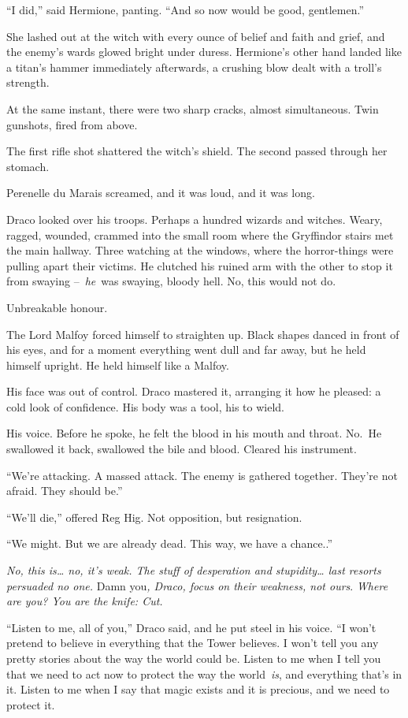 ``I did,'' said Hermione, panting. ``And so now would be good,
gentlemen.''

She lashed out at the witch with every ounce of belief and faith and
grief, and the enemy's wards glowed bright under duress. Hermione's
other hand landed like a titan's hammer immediately afterwards, a
crushing blow dealt with a troll's strength.

At the same instant, there were two sharp cracks, almost simultaneous.
Twin gunshots, fired from above.

The first rifle shot shattered the witch's shield. The second passed
through her stomach.

Perenelle du Marais screamed, and it was loud, and it was long.

\mybreak

Draco looked over his troops. Perhaps a hundred wizards and witches.
Weary, ragged, wounded, crammed into the small room where the Gryffindor
stairs met the main hallway. Three watching at the windows, where the
horror-things were pulling apart their victims. He clutched his ruined
arm with the other to stop it from swaying --~\emph{he}~was swaying,
bloody hell. No, this would not do.

Unbreakable honour.

The Lord Malfoy forced himself to straighten up. Black shapes danced in
front of his eyes, and for a moment everything went dull and far away,
but he held himself upright. He held himself like a Malfoy.

His face was out of control. Draco mastered it, arranging it how he
pleased: a cold look of confidence. His body was a tool, his to wield.

His voice. Before he spoke, he felt the blood in his mouth and throat.
No.~He swallowed it back, swallowed the bile and blood. Cleared his
instrument.

``We're attacking. A massed attack. The enemy is gathered together.
They're not afraid. They should be.''

``We'll die,'' offered Reg Hig. Not opposition, but resignation.

``We might. But we are already dead. This way, we have a chance..''

\emph{No, this is\ldots{} no, it's weak. The stuff of desperation and
stupidity\ldots{} last resorts persuaded no one.} Damn you\emph{, Draco,
focus on their weakness, not ours}. \emph{Where are you? You are the
knife: Cut.}

``Listen to me, all of you,'' Draco said, and he put steel in his voice.
``I won't pretend to believe in everything that the Tower believes. I
won't tell you any pretty stories about the way the world could be.
Listen to me when I tell you that we need to act now to protect the way
the world~\emph{is}, and everything that's in it. Listen to me when I
say that magic exists and it is precious, and we need to protect it.

